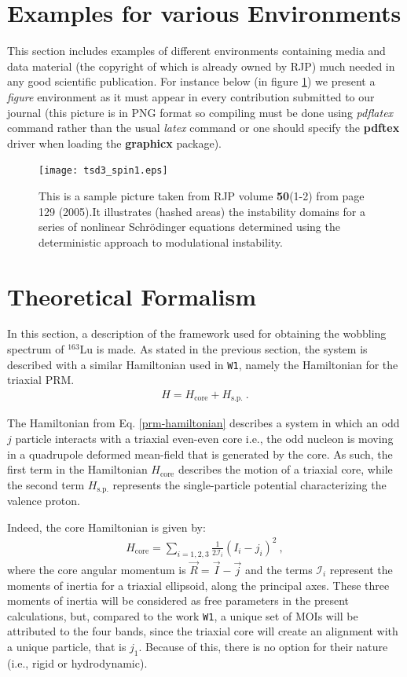 \documentclass[myclassdoc,debug]{rjparticle}
\begin{document}
\section{Examples for various Environments}
This section includes examples of different environments containing media and data material (the copyright of which is already owned by RJP) much needed in any good scientific publication. For instance below (in figure \ref{pic1}) we present a \textit{figure} environment as it must appear in every contribution submitted to our journal (this picture is in PNG format so compiling must be done using \textit{pdflatex} command rather than the usual \textit{latex} command or one should specify the \textbf{pdftex} driver when loading the \textbf{graphicx} package).
\begin{figure}[h!tb]
\centering
\texttt{[image: tsd3\_spin1.eps]}
\caption{This is a sample picture taken from RJP volume \textbf{50}(1-2) from page 129 (2005).It illustrates (hashed areas) the instability domains for a series of nonlinear Schr\"odinger equations determined using the deterministic approach to modulational instability.}
\label{pic1}
\end{figure}


\section{Theoretical Formalism}
\label{section-theory}

In this section, a description of the framework used for obtaining the wobbling spectrum of $^{163}$Lu is made. As stated in the previous section, the system is described with a similar Hamiltonian used in \texttt{W1}, namely the Hamiltonian for the triaxial PRM.
\begin{align}
    H=H_\text{core}+H_\text{s.p.}\ .
    \label{prm-hamiltonian}
\end{align}

The Hamiltonian from Eq. \ref{prm-hamiltonian} describes a system in which an odd $j$ particle interacts with a triaxial even-even core i.e., the odd nucleon is moving in a quadrupole deformed mean-field that is generated by the core. As such, the first term in the Hamiltonian $H_\text{core}$ describes the motion of a triaxial core, while the second term $H_\text{s.p.}$ represents the single-particle potential characterizing the valence proton.

Indeed, the core Hamiltonian is given by:
\begin{align}
    H_\text{core}=\sum_{i=1,2,3}\frac{1}{2\mathcal{I}_i}(I_i-j_i)^2\ ,
    \label{core-hamiltonian}
\end{align}
where the core angular momentum is $\vec{R}=\vec{I}-\vec{j}$ and the terms $\mathcal{I}_i$ represent the moments of inertia for a triaxial ellipsoid, along the principal axes. These three moments of inertia will be considered as free parameters in the present calculations, but, compared to the work \texttt{W1}, a unique set of MOIs will be attributed to the four bands, since the triaxial core will create an alignment with a unique particle, that is $j_1$. Because of this, there is no option for their nature (i.e., rigid or hydrodynamic).
\end{document}
